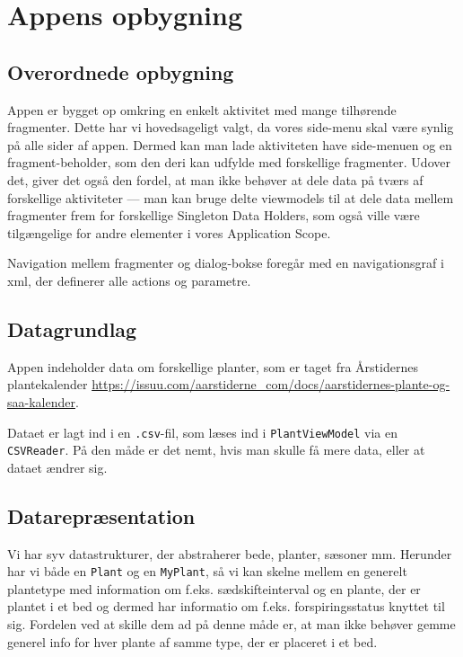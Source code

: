 \section{Appens opbygning}

\subsection{Overordnede opbygning}
Appen er bygget op omkring en enkelt aktivitet med mange tilhørende fragmenter. Dette har vi hovedsageligt valgt, da vores side-menu skal være synlig på alle sider af appen. Dermed kan man lade aktiviteten have side-menuen og en fragment-beholder, som den deri kan udfylde med forskellige fragmenter. Udover det, giver det også den fordel, at man ikke behøver at dele data på tværs af forskellige aktiviteter --- man kan bruge delte viewmodels til at dele data mellem fragmenter frem for forskellige Singleton Data Holders, som også ville være tilgængelige for andre elementer i vores Application Scope.

Navigation mellem fragmenter og dialog-bokse foregår med en navigationsgraf i xml, der definerer alle actions og parametre.

\subsection{Datagrundlag}
Appen indeholder data om forskellige planter, som er taget fra Årstidernes plantekalender \hyperlink{https://issuu.com/aarstiderne\_com/docs/aarstidernes-plante-og-saa-kalender}{https://issuu.com/aarstiderne\_com/docs/aarstidernes-plante-og-saa-kalender}.

Dataet er lagt ind i en \texttt{.csv}-fil, som læses ind i \texttt{PlantViewModel} via en \texttt{CSVReader}. På den måde er det nemt, hvis man skulle få mere data, eller at dataet ændrer sig. 

\subsection{Datarepræsentation}

Vi har syv datastrukturer, der abstraherer bede, planter, sæsoner mm. Herunder har vi både en \texttt{Plant} og en \texttt{MyPlant}, så vi kan skelne mellem en generelt plantetype med information om f.eks. sædskifteinterval og en plante, der er plantet i et bed og dermed har informatio om f.eks. forspiringsstatus knyttet til sig. Fordelen ved at skille dem ad på denne måde er, at man ikke behøver gemme generel info for hver plante af samme type, der er placeret i et bed.

